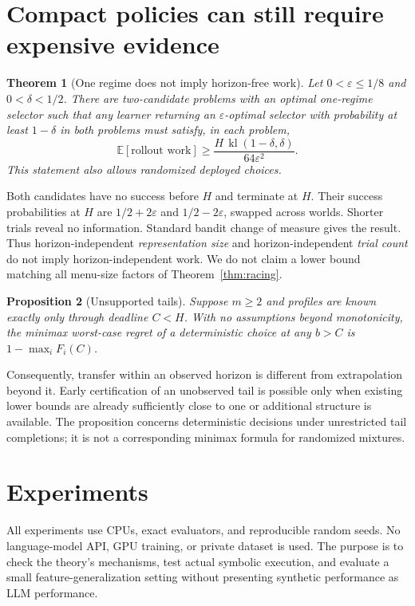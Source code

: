 \documentclass[11pt]{article}
\newtheorem{theorem}{Theorem}
\newtheorem{proposition}[theorem]{Proposition}
\theoremstyle{definition}\newtheorem{definition}[theorem]{Definition}
\newcommand{\E}{\mathbb{E}}
\newcommand{\eps}{\varepsilon}
\newcommand{\kl}{\operatorname{kl}}
\begin{document}
\section{Compact policies can still require expensive evidence}
\begin{theorem}[One regime does not imply horizon-free work]\label{thm:lower}
Let $0<\eps\le1/8$ and $0<\delta<1/2$. There are two-candidate problems with an optimal one-regime selector such that any learner returning an $\eps$-optimal selector with probability at least $1-\delta$ in both problems must satisfy, in each problem,
\begin{equation}\label{eq:lower}
 \E[\text{rollout work}]\ge
 \frac{H\,\kl(1-\delta,\delta)}{64\eps^2}.
\end{equation}
This statement also allows randomized deployed choices.
\end{theorem}
Both candidates have no success before $H$ and terminate at $H$. Their success probabilities at $H$ are $1/2+2\eps$ and $1/2-2\eps$, swapped across worlds. Shorter trials reveal no information. Standard bandit change of measure \citep{kaufmann2016} gives the result. Thus horizon-independent \emph{representation size} and horizon-independent \emph{trial count} do not imply horizon-independent work. We do not claim a lower bound matching all menu-size factors of Theorem~\ref{thm:racing}.

\begin{proposition}[Unsupported tails]\label{prop:tail}
Suppose $m\ge2$ and profiles are known exactly only through deadline $C<H$. With no assumptions beyond monotonicity, the minimax worst-case regret of a deterministic choice at any $b>C$ is $1-\max_iF_i(C)$.
\end{proposition}
Consequently, transfer within an observed horizon is different from extrapolation beyond it. Early certification of an unobserved tail is possible only when existing lower bounds are already sufficiently close to one or additional structure is available. The proposition concerns deterministic decisions under unrestricted tail completions; it is not a corresponding minimax formula for randomized mixtures.

\section{Experiments}\label{sec:experiments}
All experiments use CPUs, exact evaluators, and reproducible random seeds. No language-model API, GPU training, or private dataset is used. The purpose is to check the theory's mechanisms, test actual symbolic execution, and evaluate a small feature-generalization setting without presenting synthetic performance as LLM performance.
\end{document}
